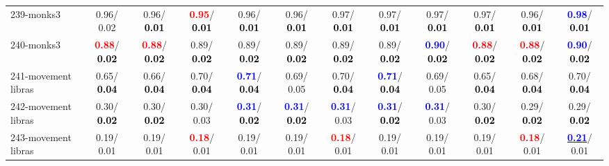 \begin{table}[h]
\begin{center}
{\begin{tabular}{lc|c|c|c|c|c|c|c|c|c|c}
239-monks3 &   0.96/  0.02 &   0.96/\textcolor{black}{\textbf{  0.01}} & \textcolor{red}{\textbf{  0.95}}/\textcolor{black}{\textbf{  0.01}} &   0.96/\textcolor{black}{\textbf{  0.01}} &   0.96/\textcolor{black}{\textbf{  0.01}} &   0.97/\textcolor{black}{\textbf{  0.01}} &   0.97/\textcolor{black}{\textbf{  0.01}} &   0.97/\textcolor{black}{\textbf{  0.01}} &   0.97/\textcolor{black}{\textbf{  0.01}} &   0.96/\textcolor{black}{\textbf{  0.01}} & \textcolor{blue}{\textbf{  0.98}}/\textcolor{black}{\textbf{  0.01}} \\
240-monks3 & \textcolor{red}{\textbf{  0.88}}/\textcolor{black}{\textbf{  0.02}} & \textcolor{red}{\textbf{  0.88}}/\textcolor{black}{\textbf{  0.02}} &   0.89/\textcolor{black}{\textbf{  0.02}} &   0.89/\textcolor{black}{\textbf{  0.02}} &   0.89/\textcolor{black}{\textbf{  0.02}} &   0.89/\textcolor{black}{\textbf{  0.02}} &   0.89/\textcolor{black}{\textbf{  0.02}} & \textcolor{blue}{\textbf{  0.90}}/\textcolor{black}{\textbf{  0.02}} & \textcolor{red}{\textbf{  0.88}}/\textcolor{black}{\textbf{  0.02}} & \textcolor{red}{\textbf{  0.88}}/\textcolor{black}{\textbf{  0.02}} & \textcolor{blue}{\textbf{  0.90}}/\textcolor{black}{\textbf{  0.02}} \\
241-movement libras &   0.65/\textcolor{black}{\textbf{  0.04}} &   0.66/\textcolor{black}{\textbf{  0.04}} &   0.70/\textcolor{black}{\textbf{  0.04}} & \textcolor{blue}{\textbf{  0.71}}/\textcolor{black}{\textbf{  0.04}} &   0.69/  0.05 &   0.70/\textcolor{black}{\textbf{  0.04}} & \textcolor{blue}{\textbf{  0.71}}/\textcolor{black}{\textbf{  0.04}} &   0.69/  0.05 &   0.65/\textcolor{black}{\textbf{  0.04}} &   0.68/\textcolor{black}{\textbf{  0.04}} &   0.70/\textcolor{black}{\textbf{  0.04}} \\
242-movement libras &   0.30/\textcolor{black}{\textbf{  0.02}} &   0.30/\textcolor{black}{\textbf{  0.02}} &   0.30/  0.03 & \textcolor{blue}{\textbf{  0.31}}/\textcolor{black}{\textbf{  0.02}} & \textcolor{blue}{\textbf{  0.31}}/\textcolor{black}{\textbf{  0.02}} & \textcolor{blue}{\textbf{  0.31}}/  0.03 & \textcolor{blue}{\textbf{  0.31}}/\textcolor{black}{\textbf{  0.02}} & \textcolor{blue}{\textbf{  0.31}}/  0.03 &   0.30/\textcolor{black}{\textbf{  0.02}} &   0.29/\textcolor{black}{\textbf{  0.02}} &   0.29/\textcolor{black}{\textbf{  0.02}} \\
243-movement libras &   0.19/  0.01 &   0.19/  0.01 & \textcolor{red}{\textbf{  0.18}}/  0.01 &   0.19/  0.01 &   0.19/  0.01 & \textcolor{red}{\textbf{  0.18}}/  0.01 &   0.19/  0.01 &   0.19/  0.01 &   0.19/  0.01 & \textcolor{red}{\textbf{  0.18}}/  0.01 & \underline{\textcolor{blue}{\textbf{  0.21}}}/  0.01 \\

\end{tabular}}
\end{center}
\end{table}
